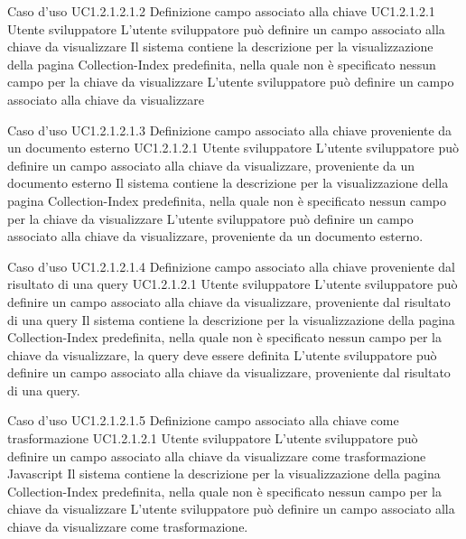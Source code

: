 \UCtitle
{Caso d'uso UC1.2.1.2.1.2}
{Definizione campo associato alla chiave}
\UC
{UC1.2.1.2.1}
{Utente sviluppatore}
{L'utente sviluppatore può definire un campo associato alla chiave da visualizzare}
{Il sistema contiene la descrizione per la visualizzazione della pagina Collection-Index predefinita, nella quale non è specificato nessun campo per la chiave da visualizzare}
\scenario
{L'utente sviluppatore può definire un campo associato alla chiave da visualizzare}

\UCtitle
{Caso d'uso UC1.2.1.2.1.3}
{Definizione campo associato alla chiave proveniente da un documento esterno}
\UC
{UC1.2.1.2.1}
{Utente sviluppatore}
{L'utente sviluppatore può definire un campo associato alla chiave da visualizzare, proveniente da un documento esterno}
{Il sistema contiene la descrizione per la visualizzazione della pagina Collection-Index predefinita, nella quale non è specificato nessun campo per la chiave da visualizzare}
\scenario
{L'utente sviluppatore può definire un campo associato alla chiave da visualizzare, proveniente da un documento esterno.}

\UCtitle
{Caso d'uso UC1.2.1.2.1.4}
{Definizione campo associato alla chiave proveniente dal risultato di una query}
\UC
{UC1.2.1.2.1}
{Utente sviluppatore}
{L'utente sviluppatore può definire un campo associato alla chiave da visualizzare, proveniente dal risultato di una query}
{Il sistema contiene la descrizione per la visualizzazione della pagina Collection-Index predefinita, nella quale non è specificato nessun campo per la chiave da visualizzare, la query deve essere definita}
\scenario
{L'utente sviluppatore può definire un campo associato alla chiave da visualizzare, proveniente dal risultato di una query.}

\UCtitle
{Caso d'uso UC1.2.1.2.1.5}
{Definizione campo associato alla chiave come trasformazione}
\UC
{UC1.2.1.2.1}
{Utente sviluppatore}
{L'utente sviluppatore può definire un campo associato alla chiave da visualizzare come trasformazione Javascript}
{Il sistema contiene la descrizione per la visualizzazione della pagina Collection-Index predefinita, nella quale non è specificato nessun campo per la chiave da visualizzare}
\scenario
{L'utente sviluppatore può definire un campo associato alla chiave da visualizzare come trasformazione.}

